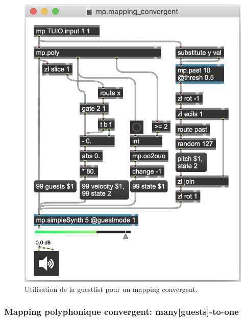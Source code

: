 \begin{figure}[!htbp]
\begin{minipage}[t]{0.58\textwidth}
	  	\includegraphics[width=\linewidth]{gfx/04_algorithms/MP-mappingConvergent.png}
		\caption[Exemple de patch MP : Utilisation de la guestlist pour un mapping convergent]{Utilisation de la guestlist pour un mapping convergent.}
		\label{fig:algorithms:MP-convergent}
	\end{minipage}
\end{figure}


\subsubsection*{Mapping polyphonique convergent: many[guests]-to-one}
\label{sec:algorithms:many-guests-to-one}

